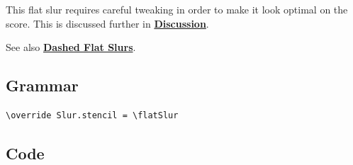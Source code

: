 This flat slur requires careful tweaking in order to make it look optimal on the score. This is discussed further in \hyperref[sec:flat_slurs_discussion]{\textbf{Discussion}}.

See also \hyperref[sec:dashed_flat_slurs]{\textbf{Dashed Flat Slurs}}.

\subsection{Grammar}
\begin{verbatim}
\override Slur.stencil = \flatSlur
\end{verbatim}

\subsection{Code}
